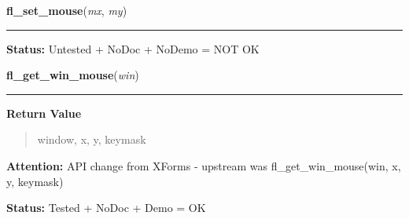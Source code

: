     \label{xformslib:library:fl_set_mouse}

    \vspace{0.5ex}

\hspace{.8\funcindent}\begin{boxedminipage}{\funcwidth}

    \raggedright \textbf{fl\_set\_mouse}(\textit{mx}, \textit{my})

    \vspace{-1.5ex}

    \rule{\textwidth}{0.5\fboxrule}
\setlength{\parskip}{2ex}
\setlength{\parskip}{1ex}
\textbf{Status:} Untested + NoDoc + NoDemo = NOT OK



    \end{boxedminipage}

    \label{xformslib:library:fl_get_win_mouse}

    \vspace{0.5ex}

\hspace{.8\funcindent}\begin{boxedminipage}{\funcwidth}

    \raggedright \textbf{fl\_get\_win\_mouse}(\textit{win})

    \vspace{-1.5ex}

    \rule{\textwidth}{0.5\fboxrule}
\setlength{\parskip}{2ex}
\setlength{\parskip}{1ex}
      \textbf{Return Value}
    \vspace{-1ex}

      \begin{quote}
      window, x, y, keymask

      \end{quote}

\textbf{Attention:} API change from XForms - upstream was fl\_get\_win\_mouse(win, x, y, 
keymask)



\textbf{Status:} Tested + NoDoc + Demo = OK



    \end{boxedminipage}

    \label{xformslib:library:fl_get_form_mouse}

